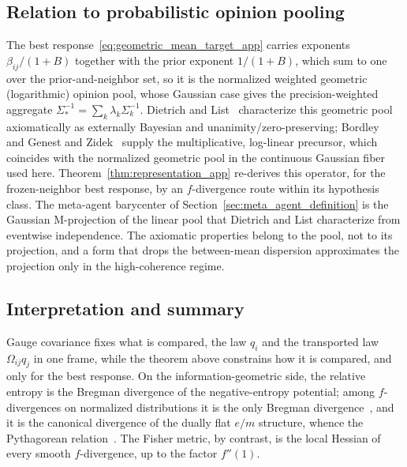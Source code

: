 \subsection*{Relation to probabilistic opinion pooling}
The best response~\eqref{eq:geometric_mean_target_app} carries exponents $\beta_{ij}/(1+B)$ together with the prior exponent $1/(1+B)$, which sum to one over the prior-and-neighbor set, so it is the normalized weighted geometric (logarithmic) opinion pool, whose Gaussian case gives the precision-weighted aggregate $\Sigma_*^{-1} = \sum_k \lambda_k \Sigma_k^{-1}$. Dietrich and List~\cite{dietrich2016probabilistic} characterize this geometric pool axiomatically as externally Bayesian and unanimity/zero-preserving; Bordley~\cite{bordley1982multiplicative} and Genest and Zidek~\cite{GenestZidek1986} supply the multiplicative, log-linear precursor, which coincides with the normalized geometric pool in the continuous Gaussian fiber used here. Theorem~\ref{thm:representation_app} re-derives this operator, for the frozen-neighbor best response, by an $f$-divergence route within its hypothesis class. The meta-agent barycenter of Section~\ref{sec:meta_agent_definition} is the Gaussian M-projection of the linear pool that Dietrich and List characterize from eventwise independence. The axiomatic properties belong to the pool, not to its projection, and a form that drops the between-mean dispersion approximates the projection only in the high-coherence regime.

\subsection*{Interpretation and summary}
Gauge covariance fixes what is compared, the law $q_i$ and the transported law $\Omega_{ij}q_j$ in one frame, while the theorem above constrains how it is compared, and only for the best response. On the information-geometric side, the relative entropy is the Bregman divergence of the negative-entropy potential; among $f$-divergences on normalized distributions it is the only Bregman divergence~\cite{Amari2009alpha}, and it is the canonical divergence of the dually flat $e/m$ structure, whence the Pythagorean relation~\cite{AmariNagaoka2000}. The Fisher metric, by contrast, is the local Hessian of every smooth $f$-divergence, up to the factor $f''(1)$.

